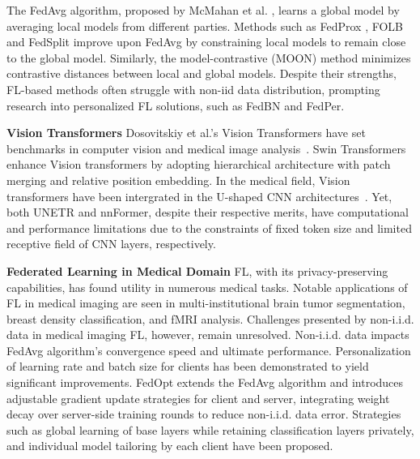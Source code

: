 The FedAvg algorithm, proposed by McMahan et al. \cite{mcmahan2017communication}, learns a global model by averaging local models from different parties. Methods such as FedProx \cite{li2020federated}, FOLB\cite{nguyen2020fast} and FedSplit\cite{pathak2020fedsplit} improve upon FedAvg by constraining local models to remain close to the global model. Similarly, the model-contrastive (MOON) method \cite{li2021model} minimizes contrastive distances between local and global models. Despite their strengths, FL-based methods often struggle with non-iid data distribution, prompting research into personalized FL solutions, such as FedBN \cite{li2021fedbn} and FedPer\cite{arivazhagan2019federated}. 

 
\textbf{Vision Transformers}
Dosovitskiy et al.'s Vision Transformers \cite{dosovitskiy2021image} have set benchmarks in computer vision and medical image analysis~\cite{liu2021swin,hatamizadeh2022unetr,shamshad2023transformers}. Swin Transformers~\cite{liu2021swin} enhance Vision transformers by adopting hierarchical architecture with patch merging and relative position embedding. In the medical field, Vision transformers have been intergrated in the U-shaped CNN architectures~\cite{hatamizadeh2022unetr,zhou2021nnformer}. Yet, both UNETR and nnFormer, despite their respective merits, have computational and performance limitations due to the constraints of fixed token size and limited receptive field of CNN layers, respectively.

\textbf{Federated Learning in Medical Domain}
FL, with its privacy-preserving capabilities, has found utility in numerous medical tasks\cite{kaissis2021end, wu2021federated, park2021federated, guo2021multi, rieke2020future}. Notable applications of FL in medical imaging are seen in multi-institutional brain tumor segmentation\cite{fedmed1, fedmed3}, breast density classification\cite{fedmed2}, and fMRI analysis\cite{li2020multi}. Challenges presented by non-i.i.d. data in medical imaging FL, however, remain unresolved\cite{rieke2020future}.  Non-i.i.d. data impacts FedAvg algorithm's convergence speed and ultimate performance\cite{li_convergence_2020, sattler_robust_2019}. Personalization of learning rate and batch size for clients has been demonstrated to yield significant improvements\cite{wang_federated_2019}. FedOpt\cite{reddi_adaptive_2020} extends the FedAvg algorithm and introduces adjustable gradient update strategies for client and server, integrating weight decay over server-side training rounds to reduce non-i.i.d. data error\cite{li_convergence_2020}. Strategies such as global learning of base layers while retaining classification layers privately\cite{arivazhagan_federated_2019}, and individual model tailoring by each client\cite{li_fedmd_2019} have been proposed.  



